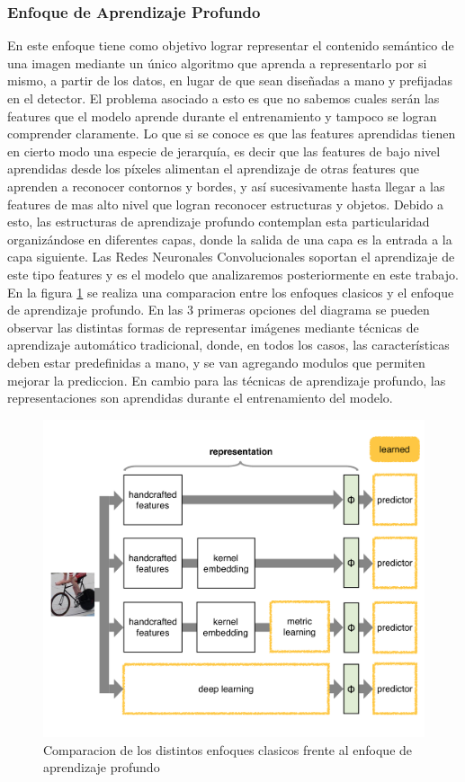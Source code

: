 \documentclass[a4paper,11pt,spanish]{book}
\begin{document}
      \subsubsection{Enfoque de Aprendizaje Profundo}
	En este enfoque tiene como objetivo lograr representar el contenido semántico de una imagen mediante un único algoritmo que aprenda a representarlo por si mismo,
	a partir de los datos, 	en lugar de que sean diseñadas a mano y prefijadas en el detector.
	El problema asociado a esto es que no sabemos cuales serán las features que el modelo aprende durante el entrenamiento y tampoco se logran comprender claramente.
	Lo que si se conoce es que las features aprendidas tienen en cierto modo una especie de jerarquía, es decir que las features de bajo nivel aprendidas desde los píxeles
	alimentan el aprendizaje de otras features que aprenden a reconocer contornos y bordes, y así sucesivamente hasta llegar a las features de mas alto nivel que logran reconocer
	estructuras y objetos. Debido a esto, las estructuras de aprendizaje profundo contemplan esta particularidad organizándose en diferentes capas, donde la salida de una capa
	es la entrada a la capa siguiente. Las Redes Neuronales Convolucionales soportan el aprendizaje de este tipo features y es el modelo que analizaremos posteriormente en este trabajo.\\
	En la figura \ref{fig:shallow_deep} se realiza una comparacion entre los enfoques clasicos y el enfoque de aprendizaje profundo.  En las 3 primeras opciones del diagrama se 
	pueden observar las distintas formas de representar imágenes mediante técnicas de aprendizaje automático tradicional,
	donde, en todos los casos, las características deben estar predefinidas a mano, y se van agregando modulos que permiten mejorar la prediccion. 
	En cambio para las técnicas de aprendizaje profundo, las representaciones son aprendidas durante el entrenamiento del modelo.
	\begin{figure}[H]
	  \begin{center}
		  \includegraphics[width=0.9\linewidth]{./img/vedaldi_shallow_deep.pdf}
	  \caption{Comparacion de los distintos enfoques clasicos frente al enfoque de aprendizaje profundo}
	  \label{fig:shallow_deep}
	  \end{center}
	\end{figure}
\end{document}
